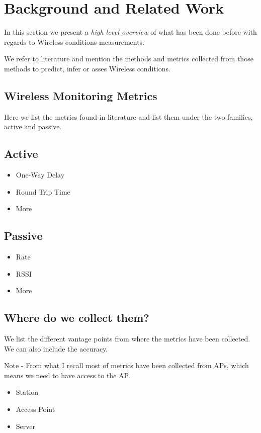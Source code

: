 \section{Background and Related Work}\label{Back_Related_Work}

In this section we present a \emph{high level overview} of what has been done before with regards to Wireless conditions measurements.

We refer to literature and mention the methods and metrics collected from those methods to predict, infer or asses Wireless conditions.

\subsection{Wireless Monitoring Metrics}

Here we list the metrics found in literature and list them under the two families, active and passive.

\subsection*{Active}

\begin{itemize}
	\item One-Way Delay
	\item Round Trip Time
	\item More
\end{itemize}

\subsection*{Passive}

\begin{itemize}
	\item Rate
	\item RSSI
	\item More
\end{itemize}

\subsection{Where do we collect them?}

We list the different vantage points from where the metrics have been collected. We can also include the accuracy.

Note - From what I recall most of metrics have been collected from APs, which means we need to have access to the AP.

\begin{itemize}
	\item Station
	\item Access Point
	\item Server
\end{itemize}
